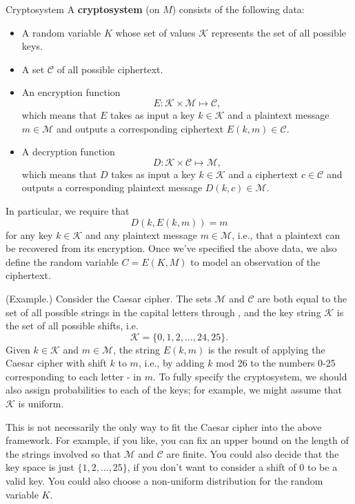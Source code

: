 \documentclass[letterpaper]{article}
\begin{document}
\begin{definition}{Cryptosystem}{}
    A \textbf{cryptosystem} (on $M$) consists of the following data: 
    \begin{itemize}
        \item A random variable $K$ whose set of values $\mathscr{K}$ represents the set of all possible keys. 
        \item A set $\mathscr{C}$ of all possible ciphertext. 
        \item An encryption function \[E: \mathscr{K} \times \mathscr{M} \mapsto \mathscr{C},\] which means that $E$ takes as input a key $k \in \mathscr{K}$ and a plaintext message $m \in \mathscr{M}$ and outputs a corresponding ciphertext $E(k, m) \in \mathscr{C}$. 
        \item A decryption function \[D: \mathscr{K} \times \mathscr{C} \mapsto \mathscr{M},\] which means that $D$ takes as input a key $k \in \mathscr{K}$ and a ciphertext $c \in \mathscr{C}$ and outputs a corresponding plaintext message $D(k, c) \in \mathscr{M}$. 
    \end{itemize}
    In particular, we require that 
    \[D(k, E(k, m)) = m\]
    for any key $k \in \mathscr{K}$ and any plaintext message $m \in \mathscr{M}$, i.e., that a plaintext can be recovered from its encryption. Once we've specified the above data, we also define the random variable $C = E(K, M)$ to model an observation of the ciphertext. 
\end{definition}

\begin{mdframed}
    (Example.) Consider the Caesar cipher. The sets $\mathscr{M}$ and $\mathscr{C}$ are both equal to the set of all possible strings in the capital letters  through , and the key string $\mathscr{K}$ is the set of all possible shifts, i.e. \[\mathscr{K} = \{0, 1, 2, \hdots, 24, 25\}.\] Given $k \in \mathscr{K}$ and $m \in \mathscr{M}$, the string $E(k, m)$ is the result of applying the Caesar cipher with shift $k$ to $m$, i.e., by adding $k$ mod 26 to the numbers 0-25 corresponding to each letter - in $m$. To fully specify the cryptosystem, we should also assign probabilities to each of the keys; for example, we might assume that $\mathscr{K}$ is uniform. 

    \bigskip 

    This is not necessarily the only way to fit the Caesar cipher into the above framework. For example, if you like, you can fix an upper bound on the length of the strings involved so that $\mathscr{M}$ and $\mathscr{C}$ are finite. You could also decide that the key space is just $\{1, 2, \hdots, 25\}$, if you don't want to consider a shift of 0 to be a valid key. You could also choose a non-uniform distribution for the random variable $K$.  
\end{mdframed}
\end{document}
